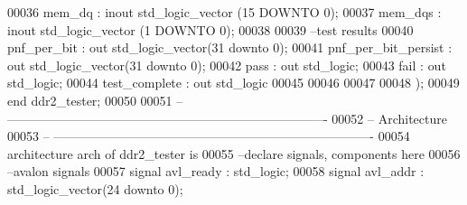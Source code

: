 \begin{DoxyCode}
00036         \textcolor{vhdlchar}{mem_dq}                  \textcolor{vhdlchar}{:} \textcolor{keywordflow}{inout} \textcolor{comment}{std\_logic\_vector} \textcolor{vhdlchar}{(}\textcolor{vhdllogic}{}\textcolor{vhdllogic}{15} \textcolor{keywordflow}{DOWNTO} \textcolor{vhdllogic}{}\textcolor{vhdllogic}{0}\textcolor{vhdlchar}{)};
00037         \textcolor{vhdlchar}{mem_dqs}                 \textcolor{vhdlchar}{:} \textcolor{keywordflow}{inout} \textcolor{comment}{std\_logic\_vector} \textcolor{vhdlchar}{(}\textcolor{vhdllogic}{}\textcolor{vhdllogic}{1} \textcolor{keywordflow}{DOWNTO} \textcolor{vhdllogic}{}\textcolor{vhdllogic}{0}\textcolor{vhdlchar}{)};
00038         
00039 \textcolor{keyword}{        --test results}
00040         \textcolor{vhdlchar}{pnf_per_bit}             \textcolor{vhdlchar}{:} \textcolor{keywordflow}{out} \textcolor{comment}{std\_logic\_vector}\textcolor{vhdlchar}{(}\textcolor{vhdllogic}{}\textcolor{vhdllogic}{31} \textcolor{keywordflow}{downto} \textcolor{vhdllogic}{}\textcolor{vhdllogic}{0}\textcolor{vhdlchar}{)};
00041         \textcolor{vhdlchar}{pnf_per_bit_persist}     \textcolor{vhdlchar}{:} \textcolor{keywordflow}{out} \textcolor{comment}{std\_logic\_vector}\textcolor{vhdlchar}{(}\textcolor{vhdllogic}{}\textcolor{vhdllogic}{31} \textcolor{keywordflow}{downto} \textcolor{vhdllogic}{}\textcolor{vhdllogic}{0}\textcolor{vhdlchar}{)};
00042         \textcolor{vhdlchar}{pass}                    \textcolor{vhdlchar}{:} \textcolor{keywordflow}{out} \textcolor{comment}{std\_logic};
00043         \textcolor{vhdlchar}{fail}                    \textcolor{vhdlchar}{:} \textcolor{keywordflow}{out} \textcolor{comment}{std\_logic}; 
00044         \textcolor{vhdlchar}{test_complete}           \textcolor{vhdlchar}{:} \textcolor{keywordflow}{out} \textcolor{comment}{std\_logic} 
00045     
00046         
00047         
00048         \textcolor{vhdlchar}{)};
00049 \textcolor{keywordflow}{end} \textcolor{vhdlchar}{ddr2\_tester};
00050 
00051 \textcolor{keyword}{-- ----------------------------------------------------------------------------}
00052 \textcolor{keyword}{-- Architecture}
00053 \textcolor{keyword}{-- ----------------------------------------------------------------------------}
00054 \textcolor{keywordflow}{architecture} arch \textcolor{keywordflow}{of} ddr2_tester is
00055 \textcolor{keyword}{--declare signals,  components here}
00056 \textcolor{keyword}{--avalon signals}
00057 \textcolor{keywordflow}{signal} \textcolor{vhdlchar}{avl_ready}           \textcolor{vhdlchar}{:} \textcolor{comment}{std\_logic};
00058 \textcolor{keywordflow}{signal} \textcolor{vhdlchar}{avl_addr}            \textcolor{vhdlchar}{:} \textcolor{comment}{std\_logic\_vector}\textcolor{vhdlchar}{(}\textcolor{vhdllogic}{}\textcolor{vhdllogic}{24} \textcolor{keywordflow}{downto} \textcolor{vhdllogic}{}\textcolor{vhdllogic}{0}\textcolor{vhdlchar}{)};

\end{DoxyCode}
